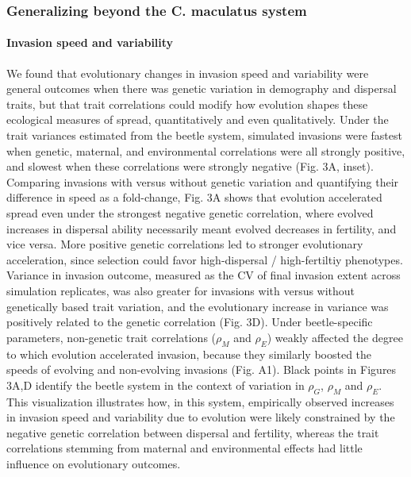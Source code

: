 \documentclass[11pt]{article}
\begin{document}
\subsubsection*{Generalizing beyond the \textup{C. maculatus} system}
\paragraph{Invasion speed and variability}
We found that evolutionary changes in invasion speed and variability were general outcomes when there was genetic variation in demography and dispersal traits, but that trait correlations could modify how evolution shapes these ecological measures of spread, quantitatively and even qualitatively.
Under the trait variances estimated from the beetle system, simulated invasions were fastest when genetic, maternal, and environmental correlations were all strongly positive, and slowest when these correlations were strongly negative (Fig. 3A, inset).
Comparing invasions with versus without genetic variation and quantifying their difference in speed as a fold-change, Fig. 3A shows that evolution accelerated spread even under the strongest negative genetic correlation, where evolved increases in dispersal ability necessarily meant evolved decreases in fertility, and vice versa.
More positive genetic correlations led to stronger evolutionary acceleration, since selection could favor high-dispersal / high-fertiltiy phenotypes.
Variance in invasion outcome, measured as the CV of final invasion extent across simulation replicates, was also greater for invasions with versus without genetically based trait variation, and the evolutionary increase in variance was positively related to the genetic correlation (Fig. 3D).
Under beetle-specific parameters, non-genetic trait correlations ($\rho_{M}$ and $\rho_{E}$) weakly affected the degree to which evolution accelerated invasion, because they similarly boosted the speeds of evolving and non-evolving invasions (Fig. A1). 
Black points in Figures 3A,D identify the beetle system in the context of variation in $\rho_{G}$, $\rho_{M}$ and $\rho_{E}$.
This visualization illustrates how, in this system, empirically observed increases in invasion speed and variability due to evolution were likely constrained by the negative genetic correlation between dispersal and fertility, whereas the trait correlations stemming from maternal and environmental effects had little influence on evolutionary outcomes.
\end{document}
